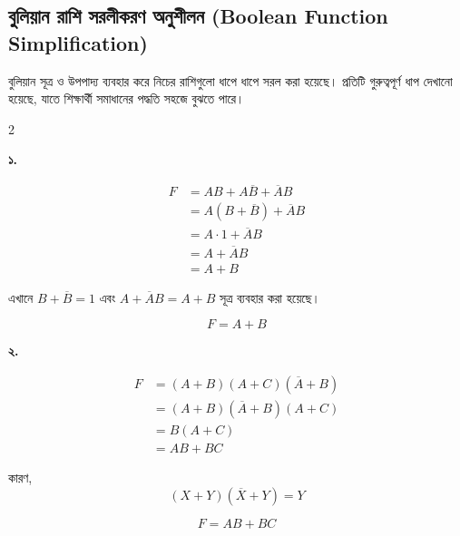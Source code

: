 
\subsection{বুলিয়ান রাশি সরলীকরণ অনুশীলন
(\textenglish{Boolean Function Simplification})}

বুলিয়ান সূত্র ও উপপাদ্য ব্যবহার করে নিচের রাশিগুলো
ধাপে ধাপে সরল করা হয়েছে। প্রতিটি গুরুত্বপূর্ণ ধাপ দেখানো হয়েছে,
যাতে শিক্ষার্থী সমাধানের পদ্ধতি সহজে বুঝতে পারে।

\setlength{\columnsep}{14pt}
\setlength{\columnseprule}{0pt}

\begin{multicols}{2}
\small


\textbf{১.}

\[
\begin{aligned}
F
&=AB+A\overline B+\overline AB\\
&=A(B+\overline B)+\overline AB\\
&=A\cdot1+\overline AB\\
&=A+\overline AB\\
&=A+B
\end{aligned}
\]

{\footnotesize
এখানে \(B+\overline B=1\) এবং
\(A+\overline AB=A+B\) সূত্র ব্যবহার করা হয়েছে।
}

\[
\boxed{F=A+B}
\]

\medskip


\textbf{২.}

\[
\begin{aligned}
F
&=(A+B)(A+C)(\overline A+B)\\
&=(A+B)(\overline A+B)(A+C)\\
&=B(A+C)\\
&=AB+BC
\end{aligned}
\]

{\footnotesize
কারণ,
\[
(X+Y)(\overline X+Y)=Y
\]
}

\[
\boxed{F=AB+BC}
\]

\medskip


\end{multicols}
